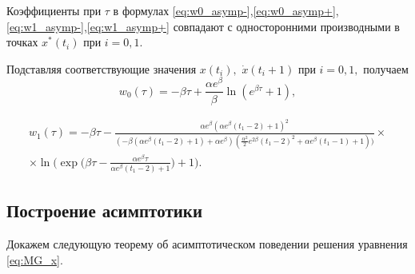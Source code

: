 \begin{remark}
	Коэффициенты при $\tau$ в формулах \eqref{eq:w0_asymp-},\eqref{eq:w0_asymp+},\eqref{eq:w1_asymp-},\eqref{eq:w1_asymp+} совпадают с односторонними производными в точках $x^*(t_i)$ при $i = 0, 1$. 
\end{remark}

Подставляя соответствующие значения $x(t_i),$ $\dot{x}(t_i + 1)$ при $i = 0, 1,$ получаем
\begin{equation}
	\label{eq:w0}
	w_0(\tau)=-\beta \tau+\frac{\alpha e^\beta}{\beta}\ln(e^{\beta\tau}+1),
\end{equation}

\small
\begin{multline}
	\label{eq:w1}
	w_1(\tau)= -\beta \tau - \frac{\alpha e^\beta(\alpha e^\beta(t_1-2)+1)^2}{(-\beta(\alpha e^\beta(t_1-2)+1)+\alpha e^\beta)(\frac{\alpha^2}{2}e^{2\beta}(t_1-2)^2+\alpha e^{\beta}(t_1-1)+1))}\times
	\\ \times\ln\Bigg(\exp\Big(\beta\tau - \frac{\alpha e^\beta\tau}{\alpha e^\beta(t_1-2)+1}\Big)+1\Bigg).
\end{multline}
\normalsize

%

\subsection{Построение асимптотики}

Докажем следующую теорему об асимптотическом поведении решения уравнения \eqref{eq:MG_x}.

